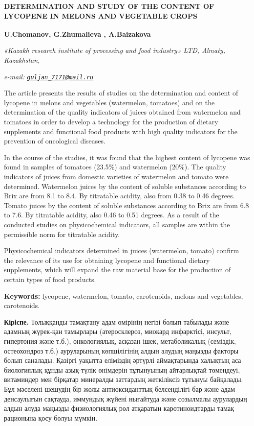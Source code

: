 {\bfseries DETERMINATION AND STUDY OF THE CONTENT OF LYCOPENE IN MELONS AND
VEGETABLE CROPS}

{\bfseries U.Chomanov, G.Zhumalieva\textsuperscript{\envelope } , A.Baizakova}

\emph{«Kazakh research institute of processing and food industry» LTD,
Almaty, Kazakhstan,}

\emph{e-mail:
\href{mailto:guljan_7171@mail.ru}{\nolinkurl{guljan\_7171@mail.ru}}}

The article presents the results of studies on the determination and
content of lycopene in melons and vegetables (watermelon, tomatoes) and
on the determination of the quality indicators of juices obtained from
watermelon and tomatoes in order to develop a technology for the
production of dietary supplements and functional food products with high
quality indicators for the prevention of oncological diseases.

In the course of the studies, it was found that the highest content of
lycopene was found in samples of tomatoes (23.5\%) and watermelon
(20\%). The quality indicators of juices from domestic varieties of
watermelon and tomato were determined. Watermelon juices by the content
of soluble substances according to Brix are from 8.1 to 8.4. By
titratable acidity, also from 0.38 to 0.46 degrees. Tomato juices by the
content of soluble substances according to Brix are from 6.8 to 7.6. By
titratable acidity, also 0.46 to 0.51 degrees. As a result of the
conducted studies on physicochemical indicators, all samples are within
the permissible norm for titratable acidity.

Physicochemical indicators determined in juices (watermelon, tomato)
confirm the relevance of its use for obtaining lycopene and functional
dietary supplements, which will expand the raw material base for the
production of certain types of food products.

{\bfseries Keywords:} lycopene, watermelon, tomato, carotenoids, melons and
vegetables, carotenoids.

{\bfseries Кіріспе.} Толыққанды тамақтану адам өмірінің негізі болып
табылады және адамның жүрек-қан тамырлары (атеросклероз, миокард
инфарктісі, инсульт, гипертония және т.б.), онкологиялық, асқазан-ішек,
метаболикалық (семіздік, остеохондроз т.б.) ауруларының көпшілігінің
алдын алудың маңызды факторы болып саналады. Қазіргі уақытта еліміздің
әртүрлі аймақтарында халықтың аса биологиялық құнды азық-түлік өнімдерін
тұтынуының айтарлықтай төмендеуі, витаминдер мен бірқатар минералды
заттардың жеткіліксіз тұтынуы байқалады. Бұл мәселені шешудің бір жолы
антиоксиданттық белсенділігі бар және адам денсаулығын сақтауда,
иммундық жүйені нығайтуда және созылмалы аурулардың алдын алуда маңызды
физиологиялық рөл атқаратын каротиноидтарды тамақ рационына қосу болуы
мүмкін.

